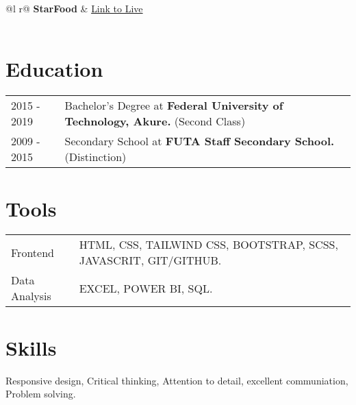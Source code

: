\documentclass[a4paper,12pt]{article}
\begin{document}
\begin{tabularx}{\linewidth}{ @{}l r@{} }
\textbf{StarFood} & \hfill \href{https://harbystardev.github.io/StarFood/}{Link to Live} \\[3.75pt]
  \\
\end{tabularx}

\section{Education}
\begin{tabularx}{\linewidth}{@{}l X@{}}	
2015 - 2019 & Bachelor's Degree at \textbf{Federal University of Technology, Akure.} \hfill \normalsize (Second Class) \\

2009 - 2015 & Secondary School at \textbf{FUTA Staff Secondary School.} \hfill (Distinction) \\ 

\end{tabularx}

\section{Tools}
\begin{tabularx}{\linewidth}{@{}l X@{}}
Frontend &  \normalsize{HTML, CSS, TAILWIND CSS, BOOTSTRAP, SCSS, JAVASCRIT, GIT/GITHUB.}\\
Data Analysis  &  \normalsize{EXCEL, POWER BI, SQL.}\\  
\end{tabularx}

\section{Skills}

Responsive design, Critical thinking, Attention to detail, excellent communiation, Problem solving.
\end{document}

